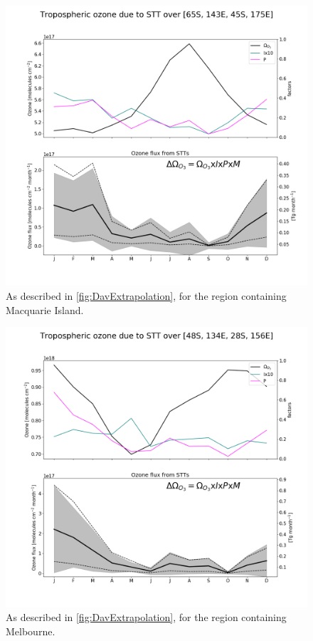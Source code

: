 \documentclass[acp, manuscript]{copernicus} %
\begin{document}
    \begin{figure}
      \includegraphics[width=12.0cm]{figures/STT_extrapolation_Mac.png}
      \caption{%
	As described in \ref{fig:DavExtrapolation}, for the region containing Macquarie Island.}
      \label{fig:MacExtrapolation}
    \end{figure}

    \begin{figure}
      \includegraphics[width=12.0cm]{figures/STT_extrapolation_Melb.png}
      \caption{%
	As described in \ref{fig:DavExtrapolation}, for the region containing Melbourne.}
      \label{fig:MelbExtrapolation}
    \end{figure}
\end{document}
